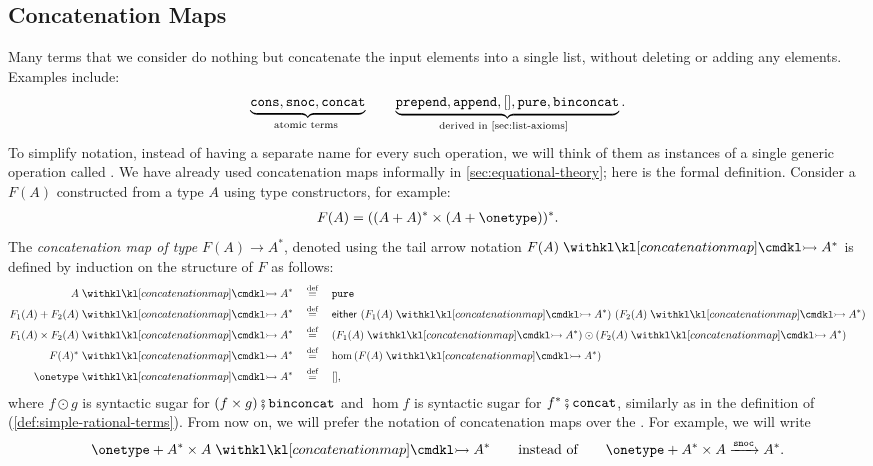 \subsection{Concatenation Maps}
\label{sec:concatenation-maps}
Many terms that we consider do nothing but concatenate the input elements into a single list, without deleting or adding any elements. Examples include:
\begin{align*}
\myunderbrace{\consterm, \snocterm, \concatterm}{atomic terms}
\qquad 
\myunderbrace{\prependterm, \appendterm, [], \pureterm, \binconcatterm}{derived in \cref{sec:list-axioms} }.
\end{align*}
To simplify notation, instead of having a separate name for every such operation, we will think of them as instances of a single generic operation called . We have already used concatenation maps informally in \cref{sec:equational-theory}; here is the formal definition. Consider a  $F(A)$ constructed from a type $A$ using type constructors, for example:
\begin{align*}
F(A) = ((A+A)^* \times (A+ \onetype))^*.
\end{align*}
The \emph{concatenation map of type $F(A) \to A^*$}, denoted using the tail arrow notation $F(A) \concmap A^*$ is defined by induction on the structure of $F$ as follows:
\begin{align*}
    A \concmap A^*              & \quad \eqdef \quad  \pureterm                                         \\
    F_1(A) + F_2(A) \concmap A^*      & \quad \eqdef \quad  \either {(F_1(A) \concmap A^*)} {(F_2(A) \concmap A^*)} \\
    F_1(A) \times F_2(A) \concmap A^* & \quad \eqdef \quad {(F_1(A) \concmap A^*)} \fdot {(F_2(A) \concmap A^*)}    \\
    F(A)^* \concmap A^*            & \quad \eqdef \quad \hom{\left( F(A) \concmap A^* \right)}                               \\
    \onetype \concmap A^*       & \quad \eqdef \quad [],
\end{align*}
where $f \odot g$ is syntactic sugar for $(f \times g)\comp \binconcatterm$ and $\hom f$ is syntactic sugar for $f^*\comp\concatterm$, similarly as in the definition of  (\cref{def:simple-rational-terms}). From now on, we will prefer the notation of concatenation maps over the . For example, we will write
\begin{align*}
\onetype + A^* \times A \concmap A^* 
\qquad \text{instead of} \qquad
\onetype + A^* \times A \xrightarrow{\snocterm} A^*.
\end{align*}
